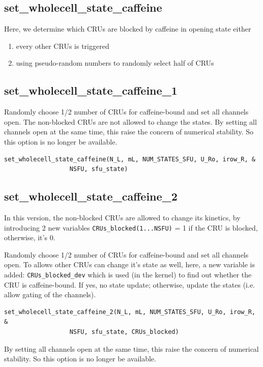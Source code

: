 \subsection{set\_wholecell\_state\_caffeine}
\label{sec:set_wholecell_state_caffeine}

Here, we determine which CRUs are blocked by caffeine in opening state either
\begin{enumerate}
  \item every other CRUs is triggered
  \item using pseudo-random numbers to randomly select half of CRUs
\end{enumerate}


\subsection{set\_wholecell\_state\_caffeine\_1}
\label{sec:set_wholecell_state_caffeine_1}

Randomly choose 1/2 number of CRUs for caffeine-bound and set all channels open.
The non-blocked CRUs are not allowed to change the states. By setting all
channels open at the same time, this raise the concern of numerical stability.
So this option is no longer be available.
\begin{verbatim}
set_wholecell_state_caffeine(N_L, mL, NUM_STATES_SFU, U_Ro, irow_R, &
                  NSFU, sfu_state)
\end{verbatim}

\subsection{set\_wholecell\_state\_caffeine\_2}
\label{sec:set_wholecell_state_caffeine_2}


In this version, the non-blocked CRUs are allowed to change its kinetics, by
introducing 2 new variables \verb!CRUs_blocked(1...NSFU)! = 1 if the CRU is
blocked, otherwise, it's 0.

Randomly choose 1/2 number of CRUs for caffeine-bound and set all channels open.
To allows other CRUs can change it's state as well, here, a new variable is
added:
\verb!CRUs_blocked_dev! which is used (in the kernel) to find out whether the
CRU is caffeine-bound. If yes, no state update; otherwise, update the states
(i.e. allow gating of the channels).
\begin{verbatim}
set_wholecell_state_caffeine_2(N_L, mL, NUM_STATES_SFU, U_Ro, irow_R, &
                  NSFU, sfu_state, CRUs_blocked)
\end{verbatim}
By setting all channels open at the same time, this raise the concern of
numerical stability. So this option is no longer be available.

